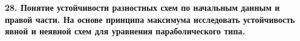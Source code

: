 \documentclass[a4paper,14pt]{article}
\begin{document}
\begin{figure}[!h]
	\label{fig:t275}
\end{figure}

\textbf{28. Понятие устойчивости разностных схем по начальным данным и правой части. На основе принципа максимума исследовать устойчивость явной и неявной схем для уравнения параболического типа.}

\begin{figure}[!h]
	\label{fig:t281}
\end{figure}
\newpage
\begin{figure}[!h]
	\label{fig:t282}
\end{figure}
\end{document}

